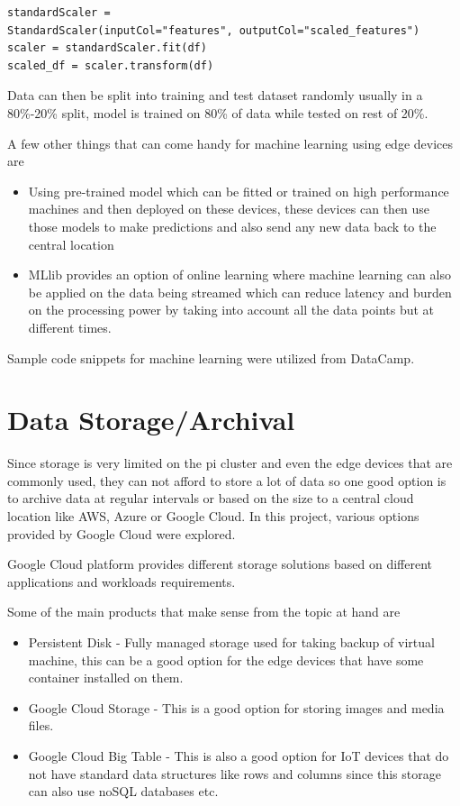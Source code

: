 \begin{verbatim}
standardScaler = 
StandardScaler(inputCol="features", outputCol="scaled_features") 
scaler = standardScaler.fit(df)
scaled_df = scaler.transform(df)
\end{verbatim}

Data can then be split into training and test dataset randomly 
usually in a 80\%-20\% split, model is trained on 80\% of data 
while tested on rest of 20\%. 

A few other things that can come handy for machine learning using 
edge devices are

\begin{itemize}
\item Using pre-trained model which can be fitted or trained on high
  performance machines and then deployed on these devices, these
  devices can then use those models to make predictions and also send
  any new data back to the central location
\item MLlib provides an option of online learning where machine
  learning can also be applied on the data being streamed which can
  reduce latency and burden on the processing power by taking into
  account all the data points but at different times.
\end{itemize}

Sample code snippets for machine learning were utilized from
DataCamp\cite{hid-sp18-510-dc}.

\section{Data Storage/Archival}

Since storage is very limited on the pi cluster and even the edge
devices that are commonly used, they can not afford to store a lot of
data so one good option is to archive data at regular intervals or
based on the size to a central cloud location like AWS, Azure or
Google Cloud. In this project, various options provided by Google
Cloud were explored.

Google Cloud platform provides different storage solutions based on
different applications and workloads requirements.

Some of the main products that make sense from the topic at hand are

\begin{itemize}
\item Persistent Disk - Fully managed storage used for taking backup
  of virtual machine, this can be a good option for the edge devices
  that have some container installed on them.
\item Google Cloud Storage - This is a good option for storing images
  and media files.
\item Google Cloud Big Table - This is also a good option for IoT
  devices that do not have standard data structures like rows and
  columns since this storage can also use noSQL databases etc.
\end{itemize} 

